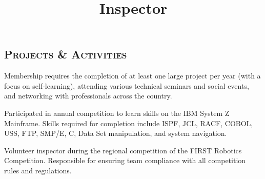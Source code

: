\begin{resume}
\section{\textsc{Projects \& Activities}}

\begin{position}
Membership requires the completion of at least one large project per year (with a focus on self-learning), attending various technical seminars and social events, and networking with professionals across the country.
\end{position}



\begin{position}
Participated in annual competition to learn skills on the IBM System Z Mainframe. Skills required for completion include ISPF, JCL, RACF, COBOL, USS, FTP, SMP/E, C, Data Set manipulation, and system navigation. 
\end{position}

\title{Inspector}
\begin{position}
Volunteer inspector during the regional competition of the FIRST Robotics Competition. Responsible for ensuring team compliance with all competition rules and regulations.
\end{position}




\end{resume}
